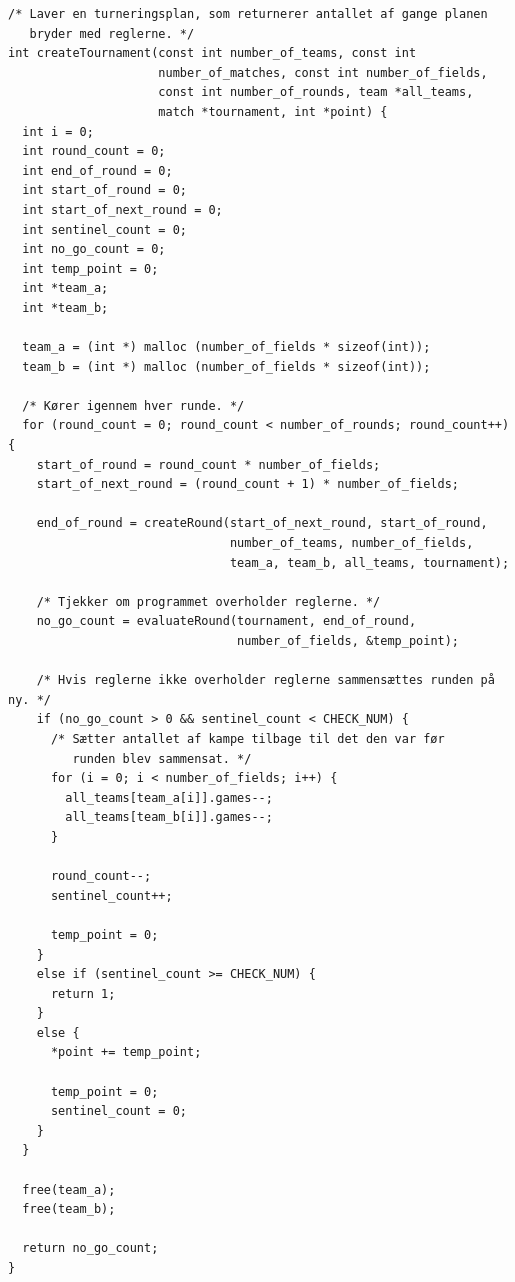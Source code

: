 \begin{listing}[H]
\begin{verbatim} 
/* Laver en turneringsplan, som returnerer antallet af gange planen 
   bryder med reglerne. */
int createTournament(const int number_of_teams, const int 
                     number_of_matches, const int number_of_fields, 
                     const int number_of_rounds, team *all_teams, 
                     match *tournament, int *point) {
  int i = 0;
  int round_count = 0;
  int end_of_round = 0;
  int start_of_round = 0;
  int start_of_next_round = 0;
  int sentinel_count = 0;
  int no_go_count = 0;
  int temp_point = 0;
  int *team_a;
  int *team_b;

  team_a = (int *) malloc (number_of_fields * sizeof(int));
  team_b = (int *) malloc (number_of_fields * sizeof(int));

  /* Kører igennem hver runde. */
  for (round_count = 0; round_count < number_of_rounds; round_count++) {
    start_of_round = round_count * number_of_fields;
    start_of_next_round = (round_count + 1) * number_of_fields;

    end_of_round = createRound(start_of_next_round, start_of_round,
                               number_of_teams, number_of_fields, 
                               team_a, team_b, all_teams, tournament);

    /* Tjekker om programmet overholder reglerne. */
    no_go_count = evaluateRound(tournament, end_of_round, 
                                number_of_fields, &temp_point);

    /* Hvis reglerne ikke overholder reglerne sammensættes runden på ny. */
    if (no_go_count > 0 && sentinel_count < CHECK_NUM) {
      /* Sætter antallet af kampe tilbage til det den var før 
         runden blev sammensat. */
      for (i = 0; i < number_of_fields; i++) {
        all_teams[team_a[i]].games--;
        all_teams[team_b[i]].games--;
      }

      round_count--;
      sentinel_count++;

      temp_point = 0;
    }
    else if (sentinel_count >= CHECK_NUM) {
      return 1;
    }
    else {
      *point += temp_point;

      temp_point = 0;
      sentinel_count = 0;
    }
  }

  free(team_a);
  free(team_b);
  
  return no_go_count;
}
\end{verbatim}
\label{code:createTournament}
\end{listing}

